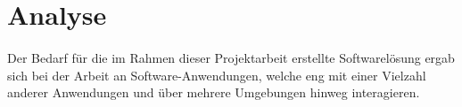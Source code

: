 \section{Analyse}
\paragraph{}
Der Bedarf für die im Rahmen dieser Projektarbeit erstellte Softwarelösung ergab
sich bei der Arbeit an Software-Anwendungen, welche eng mit einer Vielzahl
anderer Anwendungen und über mehrere Umgebungen hinweg interagieren.



 \label{Sollzustand}

